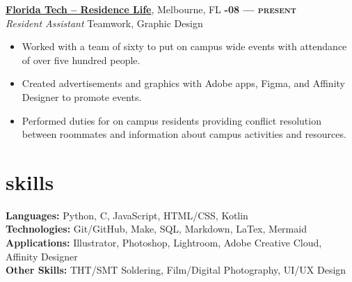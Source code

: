 \documentclass[margin,10pt]{res}
\begin{document}
\begin{resume}
        \href{https://www.fit.edu/reslife/}{\textbf{Florida Tech -- Residence Life}}, Melbourne, FL
        \hfill
        \textsc{\bfseries{}-08 --- present}
        \\
        \textit{Resident Assistant}
        \hfill
        Teamwork, Graphic Design
        \vspace{0.5em}
        \begin{itemize}
            \item Worked with a team of sixty to put on campus wide events with attendance of over five hundred people.
            \item Created advertisements and graphics with Adobe apps, Figma, and Affinity Designer to promote events.
            \item Performed duties for on campus residents providing conflict resolution between roommates and information about campus activities and resources.
        \end{itemize}

    \section{\sc \lsstyle skills}
        \textbf{Languages:} Python, C, JavaScript, \textsc{HTML/CSS}, Kotlin            \\
        \textbf{Technologies:} Git/GitHub, Make, SQL, Markdown, LaTex, Mermaid          \\
        \textbf{Applications:} Illustrator, Photoshop, Lightroom, Adobe Creative Cloud, Affinity Designer\\
        \textbf{Other Skills:} \textsc{THT/SMT} Soldering, Film/Digital Photography, UI/UX Design


\end{resume}
\end{document}
